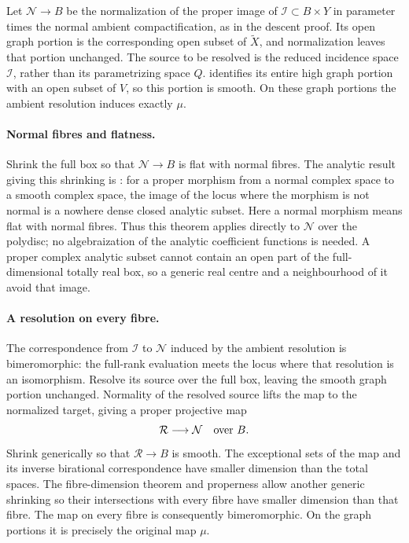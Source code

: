 Let $\mathcal{N}\to B$ be the normalization of the proper image of $\mathcal{I}\subset B\times Y$ in parameter times the normal ambient compactification, as in the descent proof. Its open graph portion is the corresponding open subset of $\widetilde X$, and normalization leaves that portion unchanged. The source to be resolved is the reduced incidence space $\mathcal{I}$, rather than its parametrizing space $Q$.  identifies its entire high graph portion with an open subset of $V$, so this portion is smooth. On these graph portions the ambient resolution induces exactly $\mu$.

\paragraph{Normal fibres and flatness.}
Shrink the full box so that $\mathcal{N}\to B$ is flat with normal fibres. The analytic result giving this shrinking is \cite[Theorem~6.2(2)(ii), including the properness clause]{Greuel2017}: for a proper morphism from a normal complex space to a smooth complex space, the image of the locus where the morphism is not normal is a nowhere dense closed analytic subset. Here a normal morphism means flat with normal fibres. Thus this theorem applies directly to $\mathcal{N}$ over the polydisc; no algebraization of the analytic coefficient functions is needed. A proper complex analytic subset cannot contain an open part of the full-dimensional totally real box, so a generic real centre and a neighbourhood of it avoid that image.

\paragraph{A resolution on every fibre.}
The correspondence from $\mathcal{I}$ to $\mathcal{N}$ induced by the ambient resolution is bimeromorphic: the full-rank evaluation meets the locus where that resolution is an isomorphism. Resolve its source over the full box, leaving the smooth graph portion unchanged. Normality of the resolved source lifts the map to the normalized target, giving a proper projective map
\[
                 \mathcal{R}\longrightarrow\mathcal{N}
                         \quad\hbox{over }B.
\]
Shrink generically so that $\mathcal{R}\to B$ is smooth. The exceptional sets of the map and its inverse birational correspondence have smaller dimension than the total spaces. The fibre-dimension theorem and properness allow another generic shrinking so their intersections with every fibre have smaller dimension than that fibre. The map on every fibre is consequently bimeromorphic. On the graph portions it is precisely the original map $\mu$.

